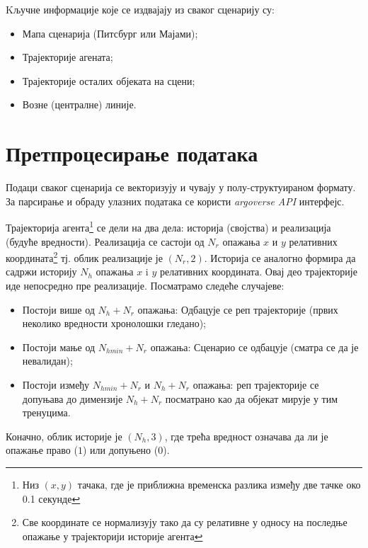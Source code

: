 \documentclass[11pt,oneside]{memoir}
\begin{document}
\noindent Kључне информације које се издвајају из сваког сценарију су:
\begin{itemize}
  \item Мапа сценарија (Питсбург или Мајами);
  \item Трајекторије агената;
  \item Трајекторије осталих објеката на сцени;
  \item Возне (централне) линије.
\end{itemize}

\section{Претпроцесирање података}

\noindent Подаци сваког сценарија се векторизују и чувају у полу-структуираном формату. 
За парсирање и обраду улазних података се користи \textit{argoverse API} интерфејс.


Трајекторија агента\footnote{Низ $(x, y)$ тачака, где је приближна временска разлика између две тачке око 0.1 секунде} 
се дели на два дела: историја (својства) и реализација (будуће вредности). Реализација се састоји од $N_r$ 
опажања $x$ и $y$ релативних координата\footnote{Све координате се нормализују тако да су релативне у односу на последње опажање у трајекторији историје агента} 
тј. облик реализације је $(N_r, 2)$. 
Историја се аналогно формира да садржи историју $N_h$ опажања $x$ i $y$ релативних координата. Овај део трајекторије иде непосредно
пре реализације. Посматрамо следеће случајеве:
\begin{itemize}
  \item Постоји више од $N_h + N_r$ опажања: Одбацује се реп трајекторије (првих неколико вредности хронолошки гледано);
  \item Постоји мање од $N_{hmin} + N_r$ опажања: Сценарио се одбацује (сматра се да је невалидан);
  \item Постоји између $N_{hmin} + N_r$ и $N_h + N_r$ опажања: реп трајекторије се допуњава до димензије $N_h + N_r$ 
  посматрано као да објекат мирује у тим тренуцима.
\end{itemize}
Коначно, облик историје је $(N_h, 3)$, где трећа вредност означава да ли је опажање право ($1$) или допуњено ($0$).
\end{document}

